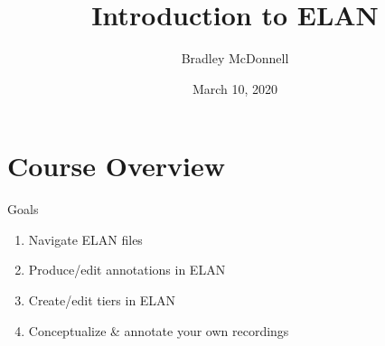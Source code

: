\documentclass{beamer}
\title[ELAN]{Introduction to ELAN}
\author[Bradley McDonnell]{Bradley McDonnell}
\date{March 10, 2020}
\begin{document}
  \section{Course Overview}
    \begin{frame}
    \titlepage
    \end{frame}
    
    \begin{frame}{Goals}
      \begin{enumerate}
        \item<1-> Navigate ELAN files
        \item<2-> Produce/edit annotations in ELAN
        \item<3-> Create/edit tiers in ELAN
        \item<4-> Conceptualize \& annotate your own recordings
      \end{enumerate}
    \end{frame}
        
\end{document}
